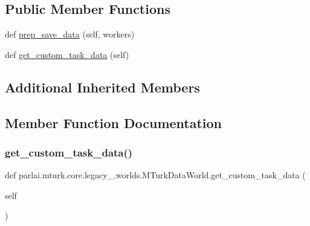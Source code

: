 \subsection*{Public Member Functions}
\begin{DoxyCompactItemize}
\item 
def \hyperlink{classparlai_1_1mturk_1_1core_1_1legacy__2018_1_1worlds_1_1MTurkDataWorld_ab0fd2eeab0ed799e565c5e97694cd135}{prep\+\_\+save\+\_\+data} (self, workers)
\item 
def \hyperlink{classparlai_1_1mturk_1_1core_1_1legacy__2018_1_1worlds_1_1MTurkDataWorld_a834f25dbb19035fa683d78980e9493c4}{get\+\_\+custom\+\_\+task\+\_\+data} (self)
\end{DoxyCompactItemize}
\subsection*{Additional Inherited Members}


\subsection{Member Function Documentation}
\mbox{\label{classparlai_1_1mturk_1_1core_1_1legacy__2018_1_1worlds_1_1MTurkDataWorld_a834f25dbb19035fa683d78980e9493c4}} 
\subsubsection{\texorpdfstring{get\+\_\+custom\+\_\+task\+\_\+data()}{get\_custom\_task\_data()}}
{\footnotesize\ttfamily def parlai.\+mturk.\+core.\+legacy\+\_.\+worlds.\+M\+Turk\+Data\+World.\+get\+\_\+custom\+\_\+task\+\_\+data (\begin{DoxyParamCaption}\item[{}]{self }\end{DoxyParamCaption})}


